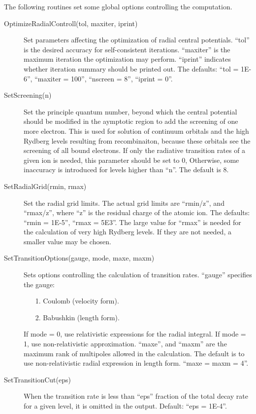 \documentclass[12pt]{article}
\begin{document}
The following routines set some global options controlling the computation.
\begin{description}
\item[OptimizeRadialControll(tol, maxiter, iprint)] 
Set parameters affecting the optimization of radial central potentials. 
``tol'' is the desired accuracy for self-consistent iterations. ``maxiter'' is
the maximum iteration the optimization may perform. ``iprint'' indicates
whether iteration summary should 
be printed out. The defaults: ``tol = 1E-6'', ``maxiter = 100'', ``nscreen =
8'', ``iprint = 0''.

\item[SetScreening(n)] 
Set the principle quantum number, beyond which the central potential should be
modified in the aymptotic region to add the screening of one more
electron. This is used for solution of continuum orbitals and the high Rydberg
levels resulting from recombinaiton, because these orbitals see the screening
of all bound electrons. If only the radiative transition rates of a given ion
is needed, this parameter should be set to 0, Otherwise, some inaccuracy is
introduced for levels higher than ``n''. The default is 8.

\item[SetRadialGrid(rmin, rmax)]
Set the radial grid limits. The actual grid limits are ``rmin/z'', and 
``rmax/z'', where ``z'' is the residual charge of the atomic ion. The
defaults: ``rmin = 1E-5'', ``rmax = 5E3''. The large value for ``rmax'' is
needed for the calculation of very high Rydberg levels. If they are not needed,
a smaller value may be chosen. 

\item[SetTransitionOptions(gauge, mode, maxe, maxm)] Sets options controlling
the calculation of transition rates. ``gauge'' specifies the gauge: 
\begin{enumerate}
\item[1.] Coulomb (velocity form).
\item[2.] Babushkin (length form). 
\end{enumerate}
If mode = 0, use relativistic expressions
for the radial integral. If mode = 1, use non-relativistic approximation. 
``maxe'', and ``maxm'' are the maximum rank of multipoles allowed in the
calculation. The default is to use non-relativistic radial expression in
length form. ``maxe = maxm = 4''. 

\item[SetTransitionCut(eps)] 
When the transition rate is less than ``eps'' fraction of the total decay rate
for a given level, it is omitted in the output. Default: ``eps = 1E-4''. 

\end{description}
\end{document}
